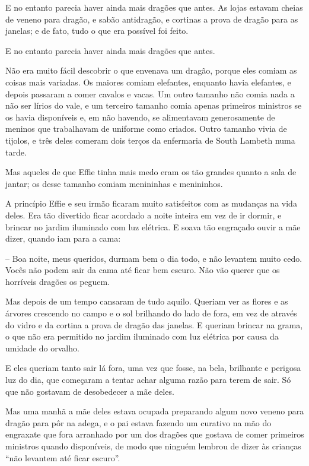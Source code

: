 E no entanto parecia haver ainda mais dragões que antes. As lojas
estavam cheias de veneno para dragão, e sabão antidragão, e cortinas
a prova de dragão para as janelas; e de fato, tudo o que era possível
foi feito.

E no entanto parecia haver ainda mais dragões que antes.

Não era muito fácil descobrir o que envenava um dragão, porque eles
comiam as coisas mais variadas. Os maiores comiam elefantes, enquanto
havia elefantes, e depois passaram a comer cavalos e vacas. Um outro
tamanho não comia nada a não ser lírios do vale, e um terceiro
tamanho comia apenas primeiros ministros se os havia disponíveis e,
em não havendo, se alimentavam generosamente de meninos que
trabalhavam de uniforme como criados. Outro tamanho vivia de tijolos,
e três deles comeram dois terços da enfermaria de South Lambeth numa
tarde.

Mas aqueles de que Effie tinha mais medo eram os tão grandes quanto a
sala de jantar; os desse tamanho comiam menininhas e menininhos.

A princípio Effie e seu irmão ficaram muito satisfeitos com as
mudanças na vida deles. Era tão divertido ficar acordado a noite
inteira em vez de ir dormir, e brincar no jardim iluminado com luz
elétrica. E soava tão engraçado ouvir a mãe dizer, quando iam para a
cama:

-- Boa noite, meus queridos, durmam bem o dia todo, e não levantem
muito cedo. Vocês não podem sair da cama até ficar bem escuro. Não
vão querer que os horríveis dragões os peguem.

Mas depois de um tempo cansaram de tudo aquilo. Queriam ver as flores
e as árvores crescendo no campo e o sol brilhando do lado de fora, em
vez de através do vidro e da cortina a prova de dragão das janelas. E
queriam brincar na grama, o que não era permitido no jardim iluminado
com luz elétrica por causa da umidade do orvalho.

E eles queriam tanto sair lá fora, uma vez que fosse, na bela,
brilhante e perigosa luz do dia, que começaram a tentar achar alguma
razão para terem de sair. Só que não gostavam de desobedecer a mãe
deles.

Mas uma manhã a mãe deles estava ocupada preparando algum novo veneno
para dragão para pôr na adega, e o pai estava fazendo um curativo na
mão do engraxate que fora arranhado por um dos dragões que gostava de
comer primeiros ministros quando disponíveis, de modo que ninguém
lembrou de dizer às crianças “não levantem até ficar escuro”.

